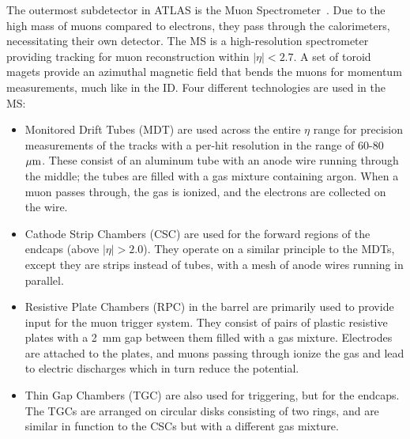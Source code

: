 The outermost subdetector in ATLAS is the Muon Spectrometer~\cite{1997.ms-tdr}.
Due to the high mass of muons compared to electrons, they pass through the calorimeters, necessitating their own detector.
The MS is a high-resolution spectrometer providing tracking for muon reconstruction within $|\eta| < 2.7$.
A set of toroid magets provide an azimuthal magnetic field that bends the muons for momentum measurements, much like in the ID.
Four different technologies are used in the MS:
\begin{itemize}
\item Monitored Drift Tubes (MDT) are used across the entire $\eta$ range for precision measurements of the tracks with a per-hit resolution in the range of 60-80~$\mu\textrm{m}$.
These consist of an aluminum tube with an anode wire running through the middle; the tubes are filled with a gas mixture containing argon.
When a muon passes through, the gas is ionized, and the electrons are collected on the wire.
\item Cathode Strip Chambers (CSC) are used for the forward regions of the endcaps (above $|\eta| > 2.0$).
They operate on a similar principle to the MDTs, except they are strips instead of tubes, with a mesh of anode wires running in parallel.
\item Resistive Plate Chambers (RPC) in the barrel are primarily used to provide input for the muon trigger system.
They consist of pairs of plastic resistive plates with a 2~mm gap between them filled with a gas mixture.
Electrodes are attached to the plates, and muons passing through ionize the gas and lead to electric discharges which in turn reduce the potential.
\item Thin Gap Chambers (TGC) are also used for triggering, but for the endcaps.
The TGCs are arranged on circular disks consisting of two rings, and are similar in function to the CSCs but with a different gas mixture.
\end{itemize}
